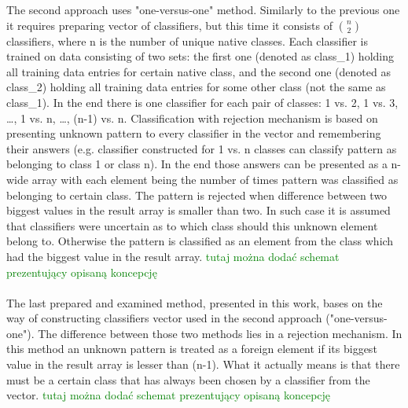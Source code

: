 \documentclass{llncs}
\begin{document}
The second approach uses "one-versus-one" method. Similarly to the previous one it requires preparing vector of classifiers, but this time it consists of ${n}\choose{2}$ classifiers, where n is the number of unique native classes. Each classifier is trained on data consisting of two sets: the first one (denoted as class\_1) holding all training data entries for certain native class, and the second one (denoted as class\_2) holding all training data entries for some other class (not the same as class\_1). In the end there is one classifier for each pair of classes: 1 vs. 2, 1 vs. 3, \dots, 1 vs. n, \dots, (n-1) vs. n. Classification with rejection mechanism is based on presenting unknown pattern to every classifier in the vector and remembering their answers (e.g. classifier constructed for 1 vs. n classes can classify pattern as belonging to class 1 or class n). In the end those answers can be presented as a n-wide array with each element being the number of times pattern was classified as belonging to certain class. The pattern is rejected when difference between two biggest values in the result array is smaller than two. In such case it is assumed that classifiers were uncertain as to which class should this unknown element belong to. Otherwise the pattern is classified as an element from the class which had the biggest value in the result array. \textcolor{green}{tutaj można dodać schemat prezentujący opisaną koncepcję} \\\\

The last prepared and examined method, presented in this work, bases on the way of constructing classifiers vector used in the second approach ("one-versus-one"). The difference between those two methods lies in a rejection mechanism. In this method an unknown pattern is treated as a foreign element if its biggest value in the result array is lesser than (n-1). What it actually means is that there must be a certain class that has always been chosen by a classifier from the vector. \textcolor{green}{tutaj można dodać schemat prezentujący opisaną koncepcję} \\




\end{document}
